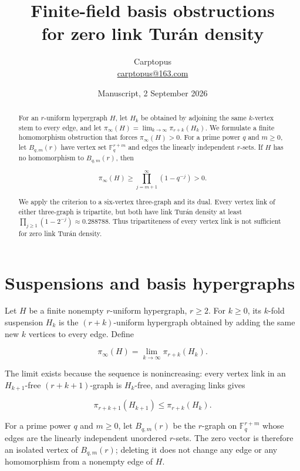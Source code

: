 \documentclass[11pt]{article}
\title{Finite-field basis obstructions\\for zero link Tur\'an density}
\author{Carptopus\\\href{mailto:carptopus@163.com}{carptopus@163.com}}
\date{Manuscript, 2 September 2026}
\numberwithin{equation}{section}
\begin{document}
\maketitle

\begin{center}
\end{center}

\begin{abstract}


For an $r$-uniform hypergraph $H$, let $H_k$ be obtained by adjoining the same $k$-vertex stem to
every edge, and let $\pi_\infty(H)=\lim_{k\to\infty}\pi_{r+k}(H_k)$. We formulate a finite
homomorphism obstruction that forces $\pi_\infty(H)>0$. For a prime power $q$ and $m\geq0$, let
$B_{q,m}(r)$ have vertex set $\mathbb F_q^{r+m}$ and edges the linearly independent $r$-sets. If
$H$ has no homomorphism to $B_{q,m}(r)$, then

\[
\pi_\infty(H)\geq\prod_{j=m+1}^{\infty}(1-q^{-j})>0.
\]

We apply the criterion to a six-vertex three-graph and its dual. Every vertex link of either
three-graph is tripartite, but both have link Tur\'an density at least
$\prod_{j\geq1}(1-2^{-j})\approx0.288788$. Thus tripartiteness of every vertex link is not
sufficient for zero link Tur\'an density.

\end{abstract}

\section{Suspensions and basis hypergraphs}


Let $H$ be a finite nonempty $r$-uniform hypergraph, $r\geq2$. For $k\geq0$, its $k$-fold
suspension $H_k$ is the $(r+k)$-uniform hypergraph obtained by adding the same new $k$ vertices to
every edge. Define

\[
\pi_\infty(H)=\lim_{k\to\infty}\pi_{r+k}(H_k).
\]

The limit exists because the sequence is nonincreasing: every vertex link in an
$H_{k+1}$-free $(r+k+1)$-graph is $H_k$-free, and averaging links gives

\[
\pi_{r+k+1}(H_{k+1})\leq\pi_{r+k}(H_k).
\]

For a prime power $q$ and $m\geq0$, let $B_{q,m}(r)$ be the $r$-graph on
$\mathbb F_q^{r+m}$ whose edges are the linearly independent unordered $r$-sets.
The zero vector is therefore an isolated vertex of $B_{q,m}(r)$; deleting it does not change any
edge or any homomorphism from a nonempty edge of $H$.
\end{document}
